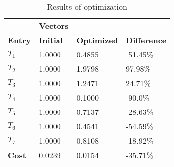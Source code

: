 \begin{table}[H]
\centering
\begin{tabular}{llll}
\textbf{}      & \cellcolor[HTML]{EFEFEF}\textbf{Vectors} & \textbf{} & \textbf{}         \\
\rowcolor[HTML]{EFEFEF} 
\textbf{Entry} & \textbf{Initial} & \textbf{Optimized} & \textbf{Difference} \\
$T_1$ & 1.0000 & 0.4855 & -51.45\% \\ 
$T_2$ & 1.0000 & 1.9798 & 97.98\% \\ 
$T_3$ & 1.0000 & 1.2471 & 24.71\% \\ 
$T_4$ & 1.0000 & 0.1000 & -90.0\% \\ 
$T_5$ & 1.0000 & 0.7137 & -28.63\% \\ 
$T_6$ & 1.0000 & 0.4541 & -54.59\% \\ 
$T_7$ & 1.0000 & 0.8108 & -18.92\% \\ 
\rowcolor[HTML]{EFEFEF} 
\textbf{Cost}  & 0.0239 & 0.0154 & -35.71\% \\ 
\end{tabular}
\caption{Results of optimization}
\label{tab:OptimizationAnalysis}
\end{table}